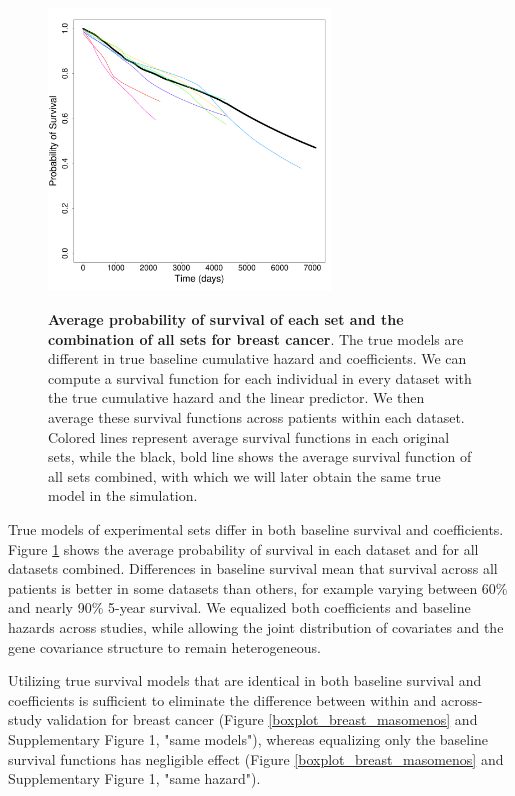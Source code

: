 \documentclass{bioinfo}
\begin{document}
  \begin{figure}[t]
  \centering
  \includegraphics[width=7.5cm]{survival_plot.pdf}\\
  \caption{\textbf{Average probability of survival of each set and the
      combination of all sets for breast cancer}. The true models are different in true
    baseline cumulative hazard and coefficients. We can compute %
    a survival function for each individual in every dataset with the
    true cumulative hazard and the linear predictor. 
    We then average these survival functions across patients within each dataset.
    Colored lines represent average survival functions in each original
    sets, while the black, bold line shows the average survival function of
    all sets combined, with which we will later obtain the same true
    model in the simulation.}\label{survplot}
\end{figure}

  True models of experimental sets differ in both baseline survival and
  coefficients. Figure \ref{survplot} shows the average probability of
  survival in each dataset and for all datasets combined. Differences
  in baseline survival mean that survival across all patients is better in some
  datasets than others, for example varying between 60\% and nearly 90\% 5-year
  survival. We equalized both coefficients and baseline hazards across
  studies, while allowing the joint distribution of covariates and the gene covariance structure to
  remain heterogeneous.

  Utilizing true survival models that are identical in both
  baseline survival and coefficients is sufficient to eliminate the
  difference between within and across-study validation for breast cancer
  (Figure \ref{boxplot_breast_masomenos} and Supplementary Figure 1, "same models"), whereas
  equalizing only the baseline survival functions has negligible effect
  (Figure \ref{boxplot_breast_masomenos} and Supplementary Figure 1, "same hazard").   
  
\end{document}
